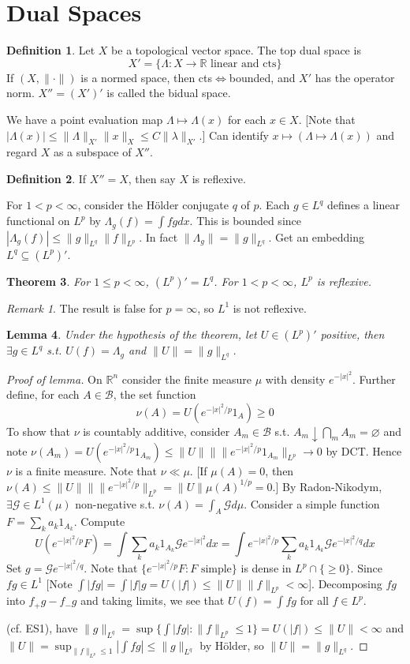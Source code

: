 \documentclass{article}
\theoremstyle{definition}
\newtheorem{defn}{Definition}[section]
\theoremstyle{remark}
\newtheorem{rem}{Remark}
\theoremstyle{plain}
\newtheorem{lem}[defn]{Lemma}
\newtheorem{thm}[defn]{Theorem}
\newcommand{\RR}{\mathbb{R}}
\begin{document}
\section{Dual Spaces}

\begin{defn}
    Let $X$ be a topological vector space. The top dual space is \[X'=\{\Lambda:X\to\RR \text{ linear and cts}\}\]
    If $(X,\|\cdot \|)$ is a normed space, then cts$\Leftrightarrow$bounded, and $X'$ has the operator norm. $X''=(X')'$ is called the bidual space.
\end{defn}
We have a point evaluation map $\Lambda\mapsto \Lambda(x)$ for each $x\in X$. [Note that $|\Lambda(x)|\le \|\Lambda\|_{X'}\|x\|_X\le C\|\lambda\|_{X'}$.] Can identify $x\mapsto (\Lambda\mapsto \Lambda(x))$ and regard $X$ as a subspace of $X''$.
\begin{defn}
    If $X''=X$, then say $X$ is reflexive.
\end{defn}
For $1<p<\infty$, consider the H\"older conjugate $q$ of $p$. Each $g\in L^q$ defines a linear functional on $L^p$ by
$\Lambda_g(f)=\int fgdx$. This is bounded since $|\Lambda_g(f)|\le\|g\|_{L^q}\|f\|_{L^p}$. In fact $\|\Lambda_g\|=\|g\|_{L^q}$. Get an embedding $L^q\subseteq (L^p)'$.
\begin{thm}
    For $1\le p<\infty$, $(L^p)'=L^q$. For $1<p<\infty$, $L^p$ is reflexive.
\end{thm}
\begin{rem}
    The result is false for $p=\infty$, so $L^1$ is not reflexive.
\end{rem}
\begin{lem}
    Under the hypothesis of the theorem, let $U\in (L^p)'$ positive, then $\exists g\in L^q$ s.t. $U(f)=\Lambda_g$ and $\|U\|=\|g\|_{L^q}$.
\end{lem}
\begin{proof}[Proof of lemma]
    On $\RR^n$ consider the finite measure $\mu$ with density $e^{-|x|^2}$. Further define, for each $A\in\mathcal B$, the set function
    \[\nu(A)= U(e^{-|x|^2/p}1_A)\ge 0\]
    To show that $\nu$ is countably additive, consider $A_m\in\mathcal B$ s.t. $A_m\downarrow\bigcap _mA_m=\varnothing$ and note $\nu(A_m)= U(e^{-|x|^2/p}1_{A_m})\le\|U\|\|\|e^{-|x|^2/p}1_{A_m}\|_{L^p}\to 0$ by DCT. Hence $\nu$ is a finite measure. Note that $\nu\ll \mu$. [If $\mu(A)=0$, then $\nu(A)\le\|U\|\|\|e^{-|x|^2/p}\|_{L^p}=\|U\|\mu(A)^{1/p}=0$.] By Radon-Nikodym, $\exists\mathcal G\in L^1(\mu)$ non-negative s.t. $\nu(A)=\int_A\mathcal G d\mu$. Consider a simple function $F=\sum_k a_k1_{A_k}$. Compute $$U(e^{-|x|^2/p}F)=\int\sum_k a_k1_{A_k}\mathcal G e^{-|x|^2}dx=\int e^{-|x|^2/p}\sum_{k}a_k1_{A_k}\mathcal G e^{-|x|^2/q}dx$$
    Set $g=\mathcal G e^{-|x|^2/q}$. Note that $\{e^{-|x|^2/p}F:F\text{ simple}\}$ is dense in $L^p\cap \{\ge 0\}$. Since $fg\in L^1$ [Note $\int |fg|=\int|f|g=U(|f|)\le \|U\|\|f\|_{L^p}<\infty$]. Decomposing $fg$ into $f_+g-f_-g$ and taking limits, we see that $U(f)=\int fg$ for all $f\in L^p$.

    (cf. ES1), have $\|g\|_{L^q}=\sup\{\int |fg|:\|f\|_{L^p}\le 1\}= U(|f|)\le\|U\|<\infty$ and $\|U\|=\sup_{\|f\|_{L^p}\le 1}|\int fg|\le\|g\|_{L^q}$ by H\"older, so $\|U\|=\|g\|_{L^q}$.
\end{proof}
\end{document}
